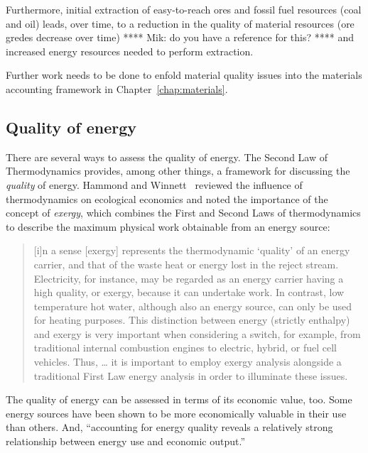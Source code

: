 Furthermore, initial extraction of easy-to-reach ores 
and fossil fuel resources (coal and oil)
leads, over time, to a reduction in the quality 
of material resources (ore gredes decrease over time) 
**** Mik: do you have a reference for this? ****
and increased energy resources needed to perform extraction.

Further work needs to be done to enfold material quality issues
into the materials accounting framework in Chapter~\ref{chap:materials}.


\subsection{Quality of energy}
\label{sec:energy_quality}

There are several ways to assess the quality of energy.
The Second Law of Thermodynamics provides, among other things,
a framework for discussing the \emph{quality} of energy.
Hammond and Winnett~\cite{Hammond:2009tu} reviewed
the influence of thermodynamics on ecological economics 
and noted the importance of the concept of \emph{exergy},
which combines the First and Second Laws of thermodynamics
to describe the maximum physical work obtainable from an energy source:

\begin{quote}
	[i]n a sense [exergy] represents the thermodynamic `quality' 
	of an energy carrier, 
	and that of the waste heat or energy lost in the reject stream. 
	Electricity, for instance, may be regarded as an energy carrier having a high quality, 
	or exergy, because it can undertake work. 
	In contrast, low temperature hot water, although also an energy source, 
	can only be used for heating purposes. 
	This distinction between energy (strictly enthalpy) and exergy is very important 
	when considering a switch, for example, 
	from traditional internal combustion engines to electric, hybrid, or fuel cell vehicles. 
	Thus, \ldots{} it is important to employ exergy analysis 
	alongside a traditional First Law energy analysis in order to illuminate these issues.
\end{quote}

The quality of energy can be assessed in terms of its economic value, too.
Some energy sources have been shown to be more economically valuable in their use
than others.
And, ``accounting for energy quality reveals a relatively strong relationship 
between energy use and economic output.''~\cite[p. 313]{Cleveland2000}

